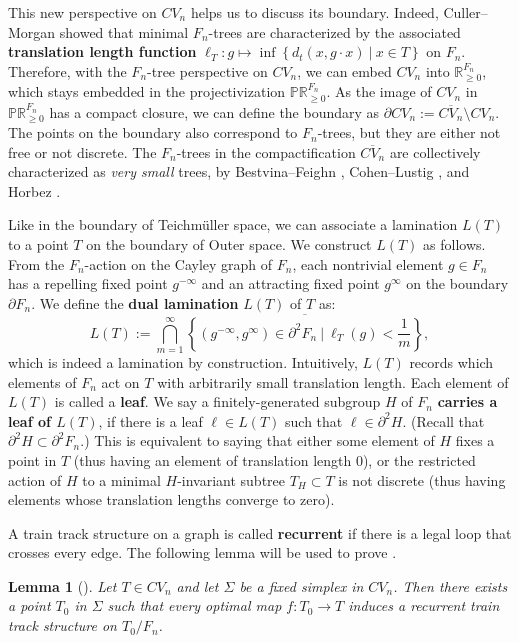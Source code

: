 \documentclass[11pt, letterpaper]{amsart}
\theoremstyle{plain}
\newtheorem{lemma}[theorem]{Lemma}
\theoremstyle{definition}
\newcommand{\R}{\mathbb{R}}
\newcommand{\bbP}{\mathbb{P}}
\newcommand{\ov}[1]{\overline{#1}}
\begin{document}
This new perspective on $CV_n$ helps us to discuss its boundary. Indeed,
Culler--Morgan \cite{culler1987groupactions} showed that minimal $F_n$-trees are
characterized by the associated \textbf{translation length function} $\ell_T: g \mapsto
\inf\left\{ d_t(x, g\cdot x)\ |\ x \in T\right\}$ on $F_n$. Therefore, with the
$F_n$-tree perspective on $CV_n$, we can embed $CV_n$ into $\R_{\geq 0}^{F_n}$, which
stays embedded in the projectivization $\bbP\R_{\geq 0}^{F_n}$. As
the image of $CV_n$ in $\bbP\R_{\geq 0}^{F_n}$
has a compact closure, we can define the boundary as
$\partial CV_n:= \ov{CV_n} \setminus CV_n$. The points on the
boundary also correspond to $F_n$-trees, but they are either not free or
not discrete. The $F_n$-trees in the compactification $\ov{CV_n}$ are collectively
characterized as \emph{very small} trees, by Bestvina--Feighn \cite{bestvina1994outerlimits},
Cohen--Lustig \cite{cohen1995verysmall}, and Horbez \cite{horbezverysmall}.



Like in the boundary of Teichm{\" u}ller space, we can associate a lamination
$L(T)$ to a point $T$ on the
boundary of Outer space. We construct $L(T)$ as
follows. From the $F_n$-action on the Cayley graph of $F_n$, each nontrivial
element $g \in F_n$ has a repelling fixed point $g^{-\infty}$ and an attracting
fixed point $g^\infty$ on the boundary $\partial F_n$. We define the
\textbf{dual lamination} $L(T)$ of $T$ as:
\[
  L(T):= \bigcap_{m=1}^\infty \overline{\left\{(g^{-\infty},g^\infty) \in \partial^2F_n\ |\ \ell_T(g)<\frac{1}{m}\right\}},
\]
which is indeed a lamination by construction. Intuitively, $L(T)$ records which
elements of $F_n$ act on $T$ with arbitrarily small translation length. 
Each element of $L(T)$ is called a \textbf{leaf}. We say a finitely-generated
subgroup $H$ of $F_n$ \textbf{carries a leaf of $L(T)$}, if there is a leaf
$\ell \in L(T)$ such that $\ell \in \partial^2H$. (Recall that $\partial^2H \subset
\partial^2F_n$.) This is equivalent to saying that either some element of $H$ fixes a point
in $T$ (thus having an element of translation length 0), or the
restricted action of $H$ to a minimal $H$-invariant subtree $T_H \subset
T$ is not discrete (thus having elements whose translation lengths converge to zero).

A train track structure on a graph is called \textbf{recurrent} if there is a legal loop
that crosses every edge. The following lemma will be used to prove .

\begin{lemma}[{\cite[Lemma 7.1]{bestvina2015boundary}}]
  \label{lem:recurrentloop}
  Let $T \in CV_n$ and let $\Sigma$ be a fixed simplex in $CV_n$. Then there
  exists a point $T_0$ in $\Sigma$ such that every optimal map $f: T_0 \to T$
  induces a recurrent train track structure on $T_0/F_n$.
\end{lemma}
\end{document}
